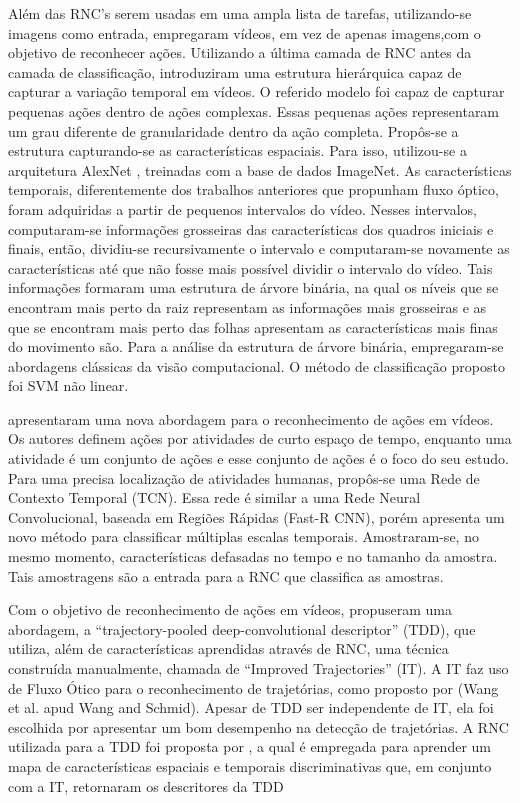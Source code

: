 \documentclass[
	12pt,				%
    oneside,			%
	a4paper,			%
	english,			%
	french,				%
	spanish,			%
	brazil,				%
	]{abntex2}
\begin{document}
Além das RNC’s serem usadas em uma ampla lista de tarefas, utilizando-se imagens como entrada,   empregaram vídeos, em vez de apenas imagens,com o objetivo de reconhecer ações. Utilizando a última camada de RNC antes da camada de classificação,  introduziram uma estrutura hierárquica capaz de capturar a variação temporal em vídeos. O referido modelo foi capaz de capturar pequenas ações dentro de ações complexas. Essas pequenas ações representaram um grau diferente de granularidade dentro da ação completa. Propôs-se a estrutura capturando-se as características espaciais. Para isso, utilizou-se a arquitetura AlexNet , treinadas com a base de dados ImageNet. As características temporais, diferentemente dos trabalhos anteriores que propunham fluxo óptico, foram adquiridas a partir de pequenos intervalos do vídeo. Nesses intervalos, computaram-se informações grosseiras das características dos quadros iniciais e finais, então, dividiu-se recursivamente o intervalo e computaram-se novamente as características até que não fosse mais possível dividir o intervalo do vídeo. Tais informações formaram uma estrutura de árvore binária, na qual os níveis que se encontram mais perto da raiz representam as informações mais grosseiras e as que se encontram mais perto das folhas apresentam as características mais finas do movimento são. Para a análise da estrutura de árvore binária, empregaram-se abordagens clássicas da visão computacional. O método de classificação proposto foi SVM não linear.

 apresentaram uma nova abordagem para o reconhecimento de ações em vídeos. Os autores definem ações por atividades de curto espaço de tempo, enquanto uma atividade é um conjunto de ações e esse conjunto de ações é o foco do seu estudo. Para uma precisa localização de atividades humanas, propôs-se uma Rede de Contexto Temporal (TCN). Essa rede é similar a uma Rede Neural Convolucional, baseada em Regiões Rápidas (Fast-R CNN), porém apresenta um novo método para classificar múltiplas escalas temporais. Amostraram-se, no mesmo momento, características defasadas no tempo e no tamanho da amostra. Tais amostragens são a entrada para a RNC que classifica as amostras.

Com o objetivo de reconhecimento de ações em vídeos,   propuseram uma abordagem, a “trajectory-pooled deep-convolutional descriptor” (TDD), que utiliza, além de características aprendidas através de RNC, uma técnica construída manualmente, chamada de “Improved Trajectories” (IT). A IT faz uso de Fluxo Ótico para o reconhecimento de trajetórias, como proposto por (Wang et al. apud Wang and Schmid). Apesar de TDD ser independente de IT, ela foi escolhida por apresentar um bom desempenho na detecção de trajetórias. A RNC utilizada para a TDD foi proposta por , a qual é empregada para aprender um mapa de características espaciais e temporais discriminativas que, em conjunto com a IT, retornaram os descritores da TDD
\end{document}

